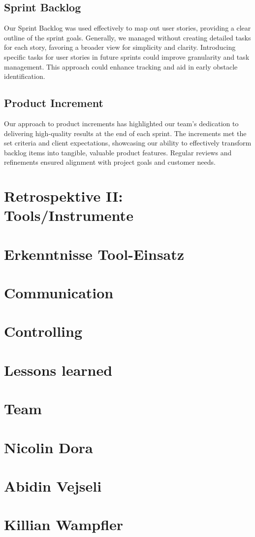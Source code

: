 \subsection{Sprint Backlog}
Our Sprint Backlog was used effectively to map out user stories, providing a clear outline of the sprint goals.
Generally, we managed without creating detailed tasks for each story, favoring a broader view for simplicity and clarity.
Introducing specific tasks for user stories in future sprints could improve granularity and task management.
This approach could enhance tracking and aid in early obstacle identification.

\subsection{Product Increment}
Our approach to product increments has highlighted our team's dedication to delivering high-quality results at the end of each sprint.
The increments met the set criteria and client expectations, showcasing our ability to effectively transform backlog items into tangible, valuable product features.
Regular reviews and refinements ensured alignment with project goals and customer needs.


\section{Retrospektive II: Tools/Instrumente}

\section{Erkenntnisse Tool-Einsatz}

\section{Communication}

\section{Controlling}

\section{Lessons learned}


\section{Team}


\section{Nicolin Dora}


\section{Abidin Vejseli}


\section{Killian Wampfler}
